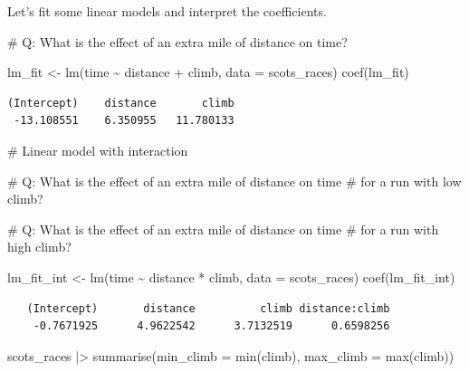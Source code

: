 \documentclass[
  11pt,
  letterpaper,
  oneside]{book}
\newenvironment{Shaded}{\begin{snugshade}}{\end{snugshade}}
\newcommand{\AttributeTok}[1]{\textcolor[rgb]{0.40,0.45,0.13}{#1}}
\newcommand{\CommentTok}[1]{\textcolor[rgb]{0.37,0.37,0.37}{#1}}
\newcommand{\FunctionTok}[1]{\textcolor[rgb]{0.28,0.35,0.67}{#1}}
\newcommand{\NormalTok}[1]{\textcolor[rgb]{0.00,0.23,0.31}{#1}}
\newcommand{\OtherTok}[1]{\textcolor[rgb]{0.00,0.23,0.31}{#1}}
\newcommand{\SpecialCharTok}[1]{\textcolor[rgb]{0.37,0.37,0.37}{#1}}
\theoremstyle{plain}
\theoremstyle{plain}
\theoremstyle{definition}
\theoremstyle{definition}
\theoremstyle{plain}
\theoremstyle{remark}
\begin{document}
Let's fit some linear models and interpret the coefficients.

\begin{Shaded}
\begin{Highlighting}[]
\CommentTok{\# Q: What is the effect of an extra mile of distance on time?}

\NormalTok{lm\_fit }\OtherTok{\textless{}{-}} \FunctionTok{lm}\NormalTok{(time }\SpecialCharTok{\textasciitilde{}}\NormalTok{ distance }\SpecialCharTok{+}\NormalTok{ climb, }\AttributeTok{data =}\NormalTok{ scots\_races)}
\FunctionTok{coef}\NormalTok{(lm\_fit)}
\end{Highlighting}
\end{Shaded}

\begin{verbatim}
(Intercept)    distance       climb 
 -13.108551    6.350955   11.780133 
\end{verbatim}

\begin{Shaded}
\begin{Highlighting}[]
\CommentTok{\# Linear model with interaction}

\CommentTok{\# Q: What is the effect of an extra mile of distance on time}
\CommentTok{\#  for a run with low climb?}

\CommentTok{\# Q: What is the effect of an extra mile of distance on time}
\CommentTok{\#  for a run with high climb?}

\NormalTok{lm\_fit\_int }\OtherTok{\textless{}{-}} \FunctionTok{lm}\NormalTok{(time }\SpecialCharTok{\textasciitilde{}}\NormalTok{ distance }\SpecialCharTok{*}\NormalTok{ climb, }\AttributeTok{data =}\NormalTok{ scots\_races)}
\FunctionTok{coef}\NormalTok{(lm\_fit\_int)}
\end{Highlighting}
\end{Shaded}

\begin{verbatim}
   (Intercept)       distance          climb distance:climb 
    -0.7671925      4.9622542      3.7132519      0.6598256 
\end{verbatim}

\begin{Shaded}
\begin{Highlighting}[]
\NormalTok{scots\_races }\SpecialCharTok{|\textgreater{}}
  \FunctionTok{summarise}\NormalTok{(}\AttributeTok{min\_climb =} \FunctionTok{min}\NormalTok{(climb), }\AttributeTok{max\_climb =} \FunctionTok{max}\NormalTok{(climb))}
\end{Highlighting}
\end{Shaded}
\end{document}

